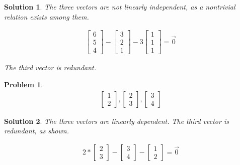 \documentclass{article}
\newtheorem{problem}{Problem}
\newtheorem*{solution}{Solution}
\begin{document}
\begin{solution}
The three vectors are not linearly independent, as a nontrivial relation exists among them.

\begin{align*} 
\begin{bmatrix} 6 \\ 5 \\ 4 \end{bmatrix} - \begin{bmatrix} 3 \\ 2 \\ 1 \end{bmatrix} - 3 \begin{bmatrix} 1 \\ 1 \\ 1 \end{bmatrix} = \vec{0}
\end{align*}

The third vector is redundant.
\end{solution}

\begin{problem}
\begin{align*}
\begin{bmatrix} 1 \\ 2 \end{bmatrix}, 
\begin{bmatrix} 2 \\ 3 \end{bmatrix},
\begin{bmatrix} 3 \\ 4 \end{bmatrix}
\end{align*}
\end{problem}

\begin{solution}
The three vectors are linearly dependent. The third vector is redundant, as shown.

\begin{align*} 
2 * \begin{bmatrix} 2 \\ 3 \end{bmatrix} - \begin{bmatrix} 3 \\ 4 \end{bmatrix} - \begin{bmatrix} 1 \\ 2 \end{bmatrix} = \vec{0}
\end{align*}
\end{solution}
\end{document}
